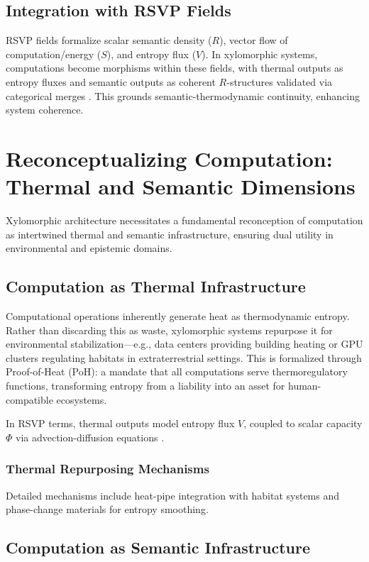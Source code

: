 \documentclass[12pt]{article}
\begin{document}
\subsection{Integration with RSVP Fields}

RSVP fields formalize scalar semantic density ($R$), vector flow of computation/energy ($S$), and entropy flux ($V$). In xylomorphic systems, computations become morphisms within these fields, with thermal outputs as entropy fluxes and semantic outputs as coherent $R$-structures validated via categorical merges \citep{ToenVezzosi2008}. This grounds semantic-thermodynamic continuity, enhancing system coherence.

\section{Reconceptualizing Computation: Thermal and Semantic Dimensions}

Xylomorphic architecture necessitates a fundamental reconception of computation as intertwined thermal and semantic infrastructure, ensuring dual utility in environmental and epistemic domains.

\subsection{Computation as Thermal Infrastructure}

Computational operations inherently generate heat as thermodynamic entropy. Rather than discarding this as waste, xylomorphic systems repurpose it for environmental stabilization—e.g., data centers providing building heating or GPU clusters regulating habitats in extraterrestrial settings. This is formalized through Proof-of-Heat (PoH): a mandate that all computations serve thermoregulatory functions, transforming entropy from a liability into an asset for human-compatible ecosystems.

In RSVP terms, thermal outputs model entropy flux $V$, coupled to scalar capacity $\Phi$ via advection-diffusion equations \citep{Padmanabhan2010}.

\subsubsection{Thermal Repurposing Mechanisms}

Detailed mechanisms include heat-pipe integration with habitat systems and phase-change materials for entropy smoothing.

\subsection{Computation as Semantic Infrastructure}
\end{document}
